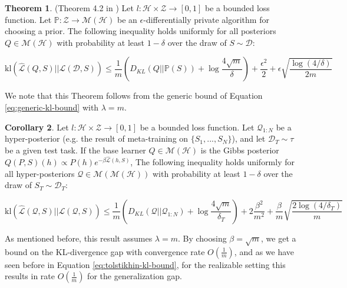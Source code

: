 \documentclass{article}
\theoremstyle{definition}
\newtheorem{theorem}{Theorem}[section]
\newtheorem{corollary}[theorem]{Corollary}
\begin{document}
\begin{theorem} (Theorem 4.2 in \citet{Dziugaite2018})
	Let $l:\mathcal{H}\times \mathcal{Z}\rightarrow [0,1]$ be a bounded loss function.
	Let $\mathbb{P}:\mathcal{Z}\rightarrow \mathcal{M}(\mathcal{H})$ be an $\epsilon$-differentially private algorithm for choosing a prior.
	The following inequality holds uniformly for all posteriors $Q\in \mathcal{M}(\mathcal{H})$ with probability at least $1-\delta$ over the draw of $S\sim \mathcal{D}$:
	
	$$\mathrm{kl}(\hat{\mathcal{L}}(Q,S)||\mathcal{L}(\mathcal{D},S))\leq \frac{1}{m}\left (D_{KL}(Q||\mathbb{P}(S))+\log\frac{4\sqrt{m}}{\delta} \right ) +\frac{\epsilon^2}{2}+\epsilon\sqrt{\frac{\log (4/\delta)}{2m}} $$

\end{theorem}

We note that this Theorem follows from the generic bound of Equation \ref{eq:generic-kl-bound} with $\lambda=m$.

\begin{corollary} \label{thm:kl-main-result}
	Let $l:\mathcal{H}\times \mathcal{Z}\rightarrow [0,1]$ be a bounded loss function.
	Let $\mathcal{Q}_{1:N}$ be a hyper-posterior (e.g. the result of meta-training on $\{S_1,...,S_N\}$), and let $\mathcal{D}_T\sim \tau$ be a given test task. 
	If the base learner $Q\in \mathcal{M}(\mathcal{H})$ is the Gibbs posterior $Q(P, S)(h)\propto P(h)e^{-\beta\hat{\mathcal{L}}(h, S)}$, 
	The following inequality holds uniformly for all hyper-posteriors $\mathcal{Q}\in \mathcal{M}(\mathcal{M}(\mathcal{H}))$ with probability at least $1-\delta$ over the draw of $S_T\sim \mathcal{D}_T$:
	
	$$\mathrm{kl}(\hat{\mathcal{L}}(\mathcal{Q},S)||\mathcal{L}(\mathcal{Q},S))\leq \frac{1}{m}\left (D_{KL}(\mathcal{Q}||\mathcal{Q}_{1:N})+\log\frac{4\sqrt{m}}{\delta_T} \right ) +2\frac{\beta^2}{m^2}+\frac{\beta}{m}\sqrt{\frac{2\log (4/\delta_T)}{m}} $$
	
\end{corollary}

As mentioned before, this result assumes $\lambda=m$. By choosing $\beta=\sqrt{m}$, we get a bound on the KL-divergence gap with convergence rate $O\left (\frac{1}{m}\right )$, 
and as we have seen before in Equation \ref{eq:tolstikhin-kl-bound}, for the realizable setting this results in rate $O\left (\frac{1}{m}\right )$ for the generalization gap.

\end{document}
